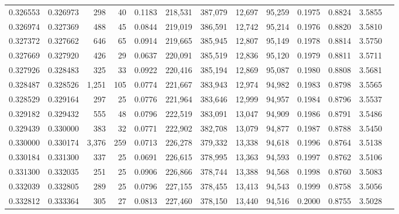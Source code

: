 \begin{tabular}{rrrrrrrrrrrrr}
0.326553 & 0.326973 &   298 &  40 &                                     0.1183 & 218,531 & 387,079 &  12,697 &  95,259 & 0.1975 & 0.8824 & 3.5855 \\
0.326974 & 0.327369 &   488 &  45 &                                     0.0844 & 219,019 & 386,591 &  12,742 &  95,214 & 0.1976 & 0.8820 & 3.5810 \\
0.327372 & 0.327662 &   646 &  65 &                                     0.0914 & 219,665 & 385,945 &  12,807 &  95,149 & 0.1978 & 0.8814 & 3.5750 \\
0.327669 & 0.327920 &   426 &  29 &                                     0.0637 & 220,091 & 385,519 &  12,836 &  95,120 & 0.1979 & 0.8811 & 3.5711 \\
0.327926 & 0.328483 &   325 &  33 &                                     0.0922 & 220,416 & 385,194 &  12,869 &  95,087 & 0.1980 & 0.8808 & 3.5681 \\
0.328487 & 0.328526 & 1,251 & 105 &                                     0.0774 & 221,667 & 383,943 &  12,974 &  94,982 & 0.1983 & 0.8798 & 3.5565 \\
0.328529 & 0.329164 &   297 &  25 &                                     0.0776 & 221,964 & 383,646 &  12,999 &  94,957 & 0.1984 & 0.8796 & 3.5537 \\
0.329182 & 0.329432 &   555 &  48 &                                     0.0796 & 222,519 & 383,091 &  13,047 &  94,909 & 0.1986 & 0.8791 & 3.5486 \\
0.329439 & 0.330000 &   383 &  32 &                                     0.0771 & 222,902 & 382,708 &  13,079 &  94,877 & 0.1987 & 0.8788 & 3.5450 \\
0.330000 & 0.330174 & 3,376 & 259 &                                     0.0713 & 226,278 & 379,332 &  13,338 &  94,618 & 0.1996 & 0.8764 & 3.5138 \\
0.330184 & 0.331300 &   337 &  25 &                                     0.0691 & 226,615 & 378,995 &  13,363 &  94,593 & 0.1997 & 0.8762 & 3.5106 \\
0.331300 & 0.332035 &   251 &  25 &                                     0.0906 & 226,866 & 378,744 &  13,388 &  94,568 & 0.1998 & 0.8760 & 3.5083 \\
0.332039 & 0.332805 &   289 &  25 &                                     0.0796 & 227,155 & 378,455 &  13,413 &  94,543 & 0.1999 & 0.8758 & 3.5056 \\
0.332812 & 0.333364 &   305 &  27 &                                     0.0813 & 227,460 & 378,150 &  13,440 &  94,516 & 0.2000 & 0.8755 & 3.5028 \\

\end{tabular}
